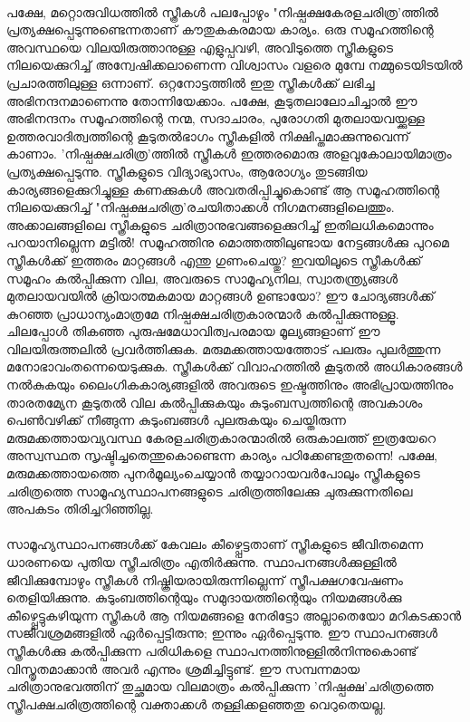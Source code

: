 \paragraph{}	പക്ഷേ, മറ്റൊരുവിധത്തിൽ സ്ത്രീകൾ പലപ്പോഴും "നിഷ്പക്ഷകേരളചരിത്ര'ത്തിൽ പ്രത്യക്ഷപ്പെടുന്നുണ്ടെന്നതാണ് കൗതുകകരമായ കാര്യം. ഒരു സമൂഹത്തിന്റെ അവസ്ഥയെ വിലയിരുത്താനുള്ള എളുപ്പവഴി, അവിടുത്തെ സ്ത്രീകളുടെ നിലയെക്കുറിച്ച് അന്വേഷിക്കലാണെന്ന വിശ്വാസം വളരെ മുമ്പേ നമ്മുടെയിടയിൽ പ്രചാരത്തിലുള്ള ഒന്നാണ്. ഒറ്റനോട്ടത്തിൽ ഇതു സ്ത്രീകൾക്ക് ലഭിച്ച അഭിനന്ദനമാണെന്നു തോന്നിയേക്കാം. പക്ഷേ, കൂടുതലാലോചിച്ചാൽ ഈ അഭിനന്ദനം സമൂഹത്തിന്റെ നന്മ, സദാചാരം, പുരോഗതി മുതലായവയ്ക്കുള്ള ഉത്തരവാദിത്വത്തിന്റെ കൂടുതൽഭാഗം സ്ത്രീകളിൽ നിക്ഷിപ്തമാക്കുന്നുവെന്ന് കാണാം. 'നിഷ്പക്ഷചരിത്ര'ത്തിൽ സ്ത്രീകൾ ഇത്തരമൊരു അളവുകോലായിമാത്രം പ്രത്യക്ഷപ്പെടുന്നു. സ്ത്രീകളുടെ വിദ്യാഭ്യാസം, ആരോഗ്യം തുടങ്ങിയ കാര്യങ്ങളെക്കുറിച്ചുള്ള കണക്കുകൾ അവതരിപ്പിച്ചുകൊണ്ട് ആ സമൂഹത്തിന്റെ നിലയെക്കുറിച്ച് "നിഷ്പക്ഷചരിത്ര'രചയിതാക്കൾ നിഗമനങ്ങളിലെത്തും. അക്കാലങ്ങളിലെ സ്ത്രീകളുടെ ചരിത്രാനുഭവങ്ങളെക്കുറിച്ച് ഇതിലധികമൊന്നും പറയാനില്ലെന്ന മട്ടിൽ! സമൂഹത്തിനു മൊത്തത്തിലുണ്ടായ നേട്ടങ്ങൾക്കു പുറമെ സ്ത്രീകൾക്ക് ഇത്തരം മാറ്റങ്ങൾ എന്തു ഗുണംചെയ്തു? ഇവയിലൂടെ സ്ത്രീകൾക്ക് സമൂഹം കൽപ്പിക്കുന്ന വില, അവരുടെ സാമൂഹ്യനില, സ്വാതന്ത്ര്യങ്ങൾ മുതലായവയിൽ ക്രിയാത്മകമായ മാറ്റങ്ങൾ ഉണ്ടായോ? ഈ ചോദ്യങ്ങൾക്ക് കുറഞ്ഞ പ്രാധാന്യംമാത്രമേ നിഷ്പക്ഷചരിത്രകാരന്മാർ കൽപ്പിക്കുന്നുള്ളൂ. ചിലപ്പോൾ തികഞ്ഞ പുരുഷമേധാവിത്വപരമായ മൂല്യങ്ങളാണ് ഈ വിലയിരുത്തലിൽ പ്രവർത്തിക്കുക. മരുമക്കത്തായത്തോട് പലരും പുലർത്തുന്ന മനോഭാവംതന്നെയെടുക്കുക. സ്ത്രീകൾക്ക് വിവാഹത്തിൽ കൂടുതൽ അധികാരങ്ങൾ നൽകുകയും ലൈംഗികകാര്യങ്ങളിൽ അവരുടെ ഇഷ്ടത്തിനും അഭിപ്രായത്തിനും താരതമ്യേന കൂടുതൽ വില കൽപ്പിക്കുകയും കുടുംബസ്വത്തിന്റെ അവകാശം പെൺവഴിക്ക് നീങ്ങുന്ന കുടുംബങ്ങൾ പുലരുകയും ചെയ്തിരുന്ന മരുമക്കത്തായവ്യവസ്ഥ കേരളചരിത്രകാരന്മാരിൽ ഒരുകാലത്ത് ഇത്രയേറെ അസ്വസ്ഥത സൃഷ്ടിച്ചതെന്തുകൊണ്ടെന്ന കാര്യം പഠിക്കേണ്ടതുതന്നെ! പക്ഷേ, മരുമക്കത്തായത്തെ പുനർമൂല്യംചെയ്യാൻ തയ്യാറായവർപോലും സ്ത്രീകളുടെ ചരിത്രത്തെ സാമൂഹ്യസ്ഥാപനങ്ങളുടെ ചരിത്രത്തിലേക്കു ചുരുക്കുന്നതിലെ അപകടം തിരിച്ചറിഞ്ഞില്ല.

\paragraph{}	സാമൂഹ്യസ്ഥാപനങ്ങൾക്ക് കേവലം കീഴ്പ്പെട്ടതാണ് സ്ത്രീകളുടെ ജീവിതമെന്ന ധാരണയെ പുതിയ സ്ത്രീചരിത്രം എതിർക്കുന്നു. സ്ഥാപനങ്ങൾക്കുള്ളിൽ ജീവിക്കുമ്പോഴും സ്ത്രീകൾ നിഷ്ക്രിയരായിരുന്നില്ലെന്ന് സ്ത്രീപക്ഷഗവേഷണം തെളിയിക്കുന്നു. കുടുംബത്തിന്റെയും സമുദായത്തിന്റെയും നിയമങ്ങൾക്കു കീഴ്പ്പെട്ടുകഴിയുന്ന സ്ത്രീകൾ ആ നിയമങ്ങളെ നേരിട്ടോ അല്ലാതെയോ മറികടക്കാൻ സജീവശ്രമങ്ങളിൽ ഏർപ്പെട്ടിരുന്നു; ഇന്നും ഏർപ്പെടുന്നു. ഈ സ്ഥാപനങ്ങൾ സ്ത്രീകൾക്കു കൽപ്പിക്കുന്ന പരിധികളെ സ്ഥാപനത്തിനുള്ളിൽനിന്നുകൊണ്ട് വിസ്തൃതമാക്കാൻ അവർ എന്നും ശ്രമിച്ചിട്ടുണ്ട്. ഈ സമ്പന്നമായ ചരിത്രാനുഭവത്തിന് തുച്ഛമായ വിലമാത്രം കൽപ്പിക്കുന്ന 'നിഷ്പക്ഷ'ചരിത്രത്തെ സ്ത്രീപക്ഷചരിത്രത്തിന്റെ വക്താക്കൾ തള്ളിക്കളഞ്ഞതു വെറുതെയല്ല.

